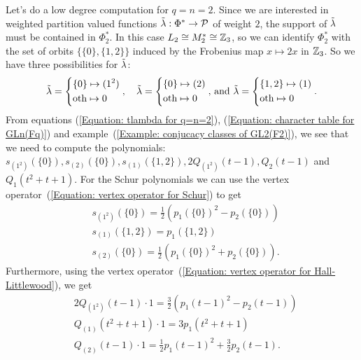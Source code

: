  Let's do a low degree computation for $q=n=2$. Since we are interested in weighted partition valued functions $\Tilde{\lambda}:\Phi^*\rightarrow\mathcal{P}$ of weight $2$, the support of $\Tilde{\lambda}$ must be contained in $\Phi^*_2$. In this case $L_2\cong M_2^*\cong\mathbb{Z}_3$, so we can identify $\Phi_2^*$ with the set of orbits $\{\{0\},\{1,2\}\}$ induced by the Frobenius map $x\mapsto 2x$ in $\mathbb{Z}_3$. So we have three possibilities for $\Tilde{\lambda}$:
 \begin{equation}\label{Equation: tlambda for q=n=2}
    \Tilde{\lambda}=\left\{ \begin{aligned}
         &\{0\}\mapsto (1^2)\\
         &\text{oth}\mapsto 0
     \end{aligned}\right.
     ,\quad
      \Tilde{\lambda}=\left\{ \begin{aligned}
         &\{0\}\mapsto (2)\\
         &\text{oth}\mapsto 0
     \end{aligned}\right.
     \text{, and }
      \Tilde{\lambda}=\left\{ \begin{aligned}
         &\{1,2\}\mapsto (1)\\
         &\text{oth}\mapsto 0
     \end{aligned}\right..
 \end{equation}
 From equations (\ref{Equation: tlambda for q=n=2}), (\ref{Equation: character table for GLn(Fq)}) and example~(\ref{Example: conjucacy classes of GL2(F2)}), we see that we need to compute the polynomials: $s_{(1^2)}(\{0\}), s_{(2)}(\{0\}), s_{(1)}(\{1,2\}), 2Q_{(1^2)}(t-1), Q_2(t-1)$ and $Q_1(t^2+t+1)$. For the Schur polynomials we can use the vertex operator~(\ref{Equation: vertex operator for Schur}) to get
 \begin{equation}
     \begin{split}
         &s_{(1^2)}(\{0\})=\frac{1}{2}(p_1(\{0\})^2-p_2(\{0\}))\\
         &s_{(1)}(\{1,2\})=p_1(\{1,2\})\\
         &s_{(2)}(\{0\})=\frac{1}{2}(p_1(\{0\})^2+p_2(\{0\})).
     \end{split}
 \end{equation}
 Furthermore, using the vertex operator~(\ref{Equation: vertex operator for Hall-Littlewood}), we get
 \begin{equation}
     \begin{split}
         &2Q_{(1^2)}(t-1)\cdot1 = \frac{3}{2}(p_1(t-1)^2-p_2(t-1))\\
         &Q_{(1)}(t^2+t+1)\cdot1 = 3p_1(t^2+t+1)\\
         &Q_{(2)}(t-1)\cdot1 = \frac{1}{2}p_1(t-1)^2+\frac{3}{2}p_2(t-1).
     \end{split}
 \end{equation}
